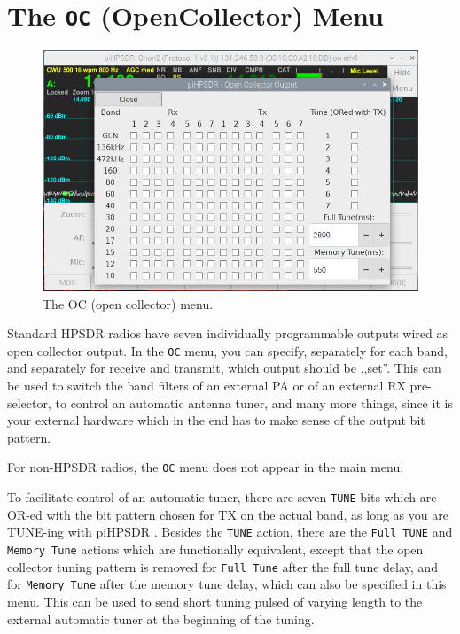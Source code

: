 \documentclass[12pt]{book}
\def\rett#1{\texttt{\color{red}#1}}
\def\bltt#1{\texttt{\color{blue}#1}}
\def\pH{pi\-HPSDR }
\begin{document}
\section{The \texttt{OC} (OpenCollector) Menu}

\begin{figure}[ht]
\center
\includegraphics[width=12cm]{OCMenu.png}
\caption{The OC (open collector) menu.}
\label{fig:OCMenu}
\end{figure}

Standard HPSDR radios have seven individually programmable outputs wired as
open collector output. In the \bltt{OC} menu, you can specify, separately
for each band, and separately for receive and transmit, which output should
be ,,set''. This can be used to switch the band filters of an external PA
or of an external RX pre-selector, to control an automatic antenna tuner,
and many more things, since it is
your external hardware which in the end has to make sense of the output
bit pattern.

For non-HPSDR radios, the \bltt{OC} menu does not appear in the main menu.

To facilitate control of an automatic tuner, there are seven \rett{TUNE}
bits which are OR-ed with the bit pattern chosen for TX on the actual band,
as long as you are TUNE-ing with \pH. Besides the \bltt{TUNE} action,
there are the \bltt{Full TUNE} and \bltt{Memory Tune} actions which are
functionally equivalent, except that the open collector tuning pattern
is removed for \bltt{Full Tune} after the full tune delay, and for \bltt{Memory Tune}
after the memory tune delay, which can also be specified in this menu.
This can be used to send short tuning pulsed of varying length to the
external automatic tuner at the beginning of the tuning.
\end{document}
